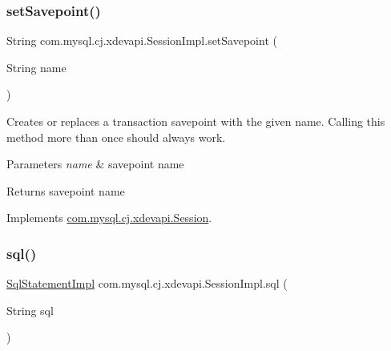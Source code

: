 \mbox{\label{classcom_1_1mysql_1_1cj_1_1xdevapi_1_1_session_impl_a4425c6c14d6b1159a23c0ede2b2e120d}} 
\subsubsection{\texorpdfstring{set\+Savepoint()}{setSavepoint()}\hspace{0.1cm}{\footnotesize\ttfamily [2/2]}}
{\footnotesize\ttfamily String com.\+mysql.\+cj.\+xdevapi.\+Session\+Impl.\+set\+Savepoint (\begin{DoxyParamCaption}\item[{String}]{name }\end{DoxyParamCaption})}

Creates or replaces a transaction savepoint with the given name. Calling this method more than once should always work.


\begin{DoxyParams}{Parameters}
{\em name} & savepoint name \\
\hline
\end{DoxyParams}
\begin{DoxyReturn}{Returns}
savepoint name 
\end{DoxyReturn}


Implements \mbox{\hyperlink{interfacecom_1_1mysql_1_1cj_1_1xdevapi_1_1_session_a0729993f853b93bd8c819194aaa5f258}{com.\+mysql.\+cj.\+xdevapi.\+Session}}.

\mbox{\label{classcom_1_1mysql_1_1cj_1_1xdevapi_1_1_session_impl_a28b412626c5f92aa146ede32d4e8033d}} 
\subsubsection{\texorpdfstring{sql()}{sql()}}
{\footnotesize\ttfamily \mbox{\hyperlink{classcom_1_1mysql_1_1cj_1_1xdevapi_1_1_sql_statement_impl}{Sql\+Statement\+Impl}} com.\+mysql.\+cj.\+xdevapi.\+Session\+Impl.\+sql (\begin{DoxyParamCaption}\item[{String}]{sql }\end{DoxyParamCaption})}

